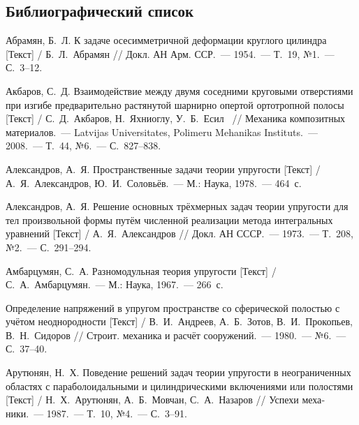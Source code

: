 
\begin{russian}
\setcounter{secnumdepth}{-1}
\chapter{Библиографический список}
\setcounter{secnumdepth}{2}

\renewcommand{\bibliststyle}{\normalsize}
\renewcommand{\bibnumfmt}[1]{#1.\hfill}

\begin{biblist}{99}\setlength\itemsep{-1.9pt}

Абрамян, Б.~Л. 
К задаче осесимметричной деформации круглого цилиндра [Текст] 
/ Б.~Л.~Абрамян 
// Докл. АН Арм. ССР.~--- 1954.~--- Т.~19, №1.~--- С.~3--12.

Акбаров, С.~Д. 
Взаимодействие между двумя соседними круговыми отверстиями при изгибе предварительно растянутой шарнирно опертой ортотропной полосы [Текст] 
/ С.~Д.~Акбаров, Н.~Яхниоглу, У.~Б.~Есил~
// Механика композитных материалов.~--- Latvijas Universitates, Polimeru Mehanikas Instituts.~--- 2008.~--- Т.~44, №6.~--- С.~827--838.

Александров, А.~Я. 
Пространственные задачи теории упругости [Текст] 
/ А.~Я.~Александров, Ю.~И.~Соловьёв.~--- М.: Наука, 1978.~--- 464~с.

Александров, А.~Я. 
Решение основных трёхмерных задач теории упругости для тел произвольной формы путём численной реализации метода интегральных уравнений [Текст] / А.~Я.~Александров 
// Докл. АН СССР.~--- 1973.~--- Т.~208, №2.~--- С.~291--294.

Амбарцумян, С.~А. 
Разномодульная теория упругости [Текст] 
/ С.~А.~Амбарцумян.~--- М.: Наука, 1967.~--- 266~с.

Определение напряжений в упругом пространстве со сферической полостью с учётом неоднородности [Текст] 
/ В.~И.~Андреев, А.~Б.~Зотов, В.~И.~Прокопьев, В.~Н.~Сидоров 
// Строит. механика и расчёт сооружений.~--- 1980.~--- №6.~--- С.~37--40.

Арутюнян, Н.~Х. 
Поведение решений задач теории упругости в неограниченных областях с параболоидальными и цилиндрическими включениями или полостями [Текст] 
/ Н.~Х.~Арутюнян, А.~Б.~Мовчан, С.~А.~Назаров 
// Успехи механики.~--- 1987.~--- Т.~10, №4.~--- С.~3--91.


\end{biblist}
\end{russian}
